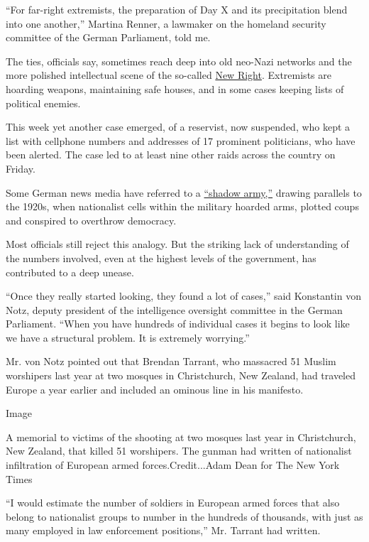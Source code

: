 ``For far-right extremists, the preparation of Day X and its
precipitation blend into one another,'' Martina Renner, a lawmaker on
the homeland security committee of the German Parliament, told me.

The ties, officials say, sometimes reach deep into old neo-Nazi networks
and the more polished intellectual scene of the so-called
\href{https://www.nytimes.com/2018/12/27/world/europe/germany-far-right-generation-identity.html}{New
Right}. Extremists are hoarding weapons, maintaining safe houses, and in
some cases keeping lists of political enemies.

This week yet another case emerged, of a reservist, now suspended, who
kept a list with cellphone numbers and addresses of 17 prominent
politicians, who have been alerted. The case led to at least nine other
raids across the country on Friday.

Some German news media have referred to a
\href{https://taz.de/Rechtes-Netzwerk-in-der-Bundeswehr/!5548926/}{``shadow
army,''} drawing parallels to the 1920s, when nationalist cells within
the military hoarded arms, plotted coups and conspired to overthrow
democracy.

Most officials still reject this analogy. But the striking lack of
understanding of the numbers involved, even at the highest levels of the
government, has contributed to a deep unease.

``Once they really started looking, they found a lot of cases,'' said
Konstantin von Notz, deputy president of the intelligence oversight
committee in the German Parliament. ``When you have hundreds of
individual cases it begins to look like we have a structural problem. It
is extremely worrying.''

Mr. von Notz pointed out that Brendan Tarrant, who massacred 51 Muslim
worshipers last year at two mosques in Christchurch, New Zealand, had
traveled Europe a year earlier and included an ominous line in his
manifesto.

Image

A memorial to victims of the shooting at two mosques last year in
Christchurch, New Zealand, that killed 51 worshipers. The gunman had
written of nationalist infiltration of European armed
forces.Credit...Adam Dean for The New York Times

``I would estimate the number of soldiers in European armed forces that
also belong to nationalist groups to number in the hundreds of
thousands, with just as many employed in law enforcement positions,''
Mr. Tarrant had written.

